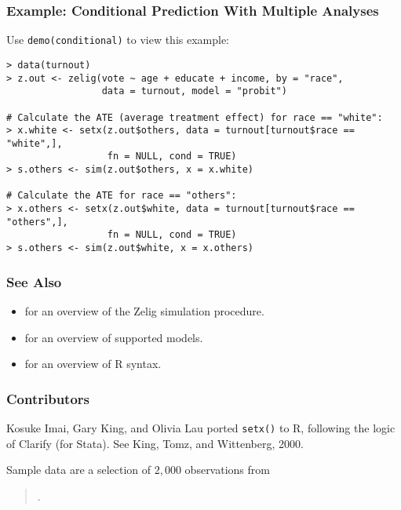 \subsubsection{Example: Conditional Prediction With Multiple Analyses}
Use {\tt demo(conditional)} to view this example:  
\begin{verbatim}
> data(turnout)
> z.out <- zelig(vote ~ age + educate + income, by = "race",
                 data = turnout, model = "probit")

# Calculate the ATE (average treatment effect) for race == "white":
> x.white <- setx(z.out$others, data = turnout[turnout$race == "white",], 
                  fn = NULL, cond = TRUE)
> s.others <- sim(z.out$others, x = x.white)

# Calculate the ATE for race == "others":
> x.others <- setx(z.out$white, data = turnout[turnout$race == "others",], 
                  fn = NULL, cond = TRUE)
> s.others <- sim(z.out$white, x = x.others)
\end{verbatim} %

\subsubsection{See Also}
  \begin{itemize}
  \item {} for an overview of the Zelig simulation
    procedure.
  \item {} for an overview of supported models.
  \item {} for an overview of R syntax.
\end{itemize}

\subsubsection{Contributors}

Kosuke Imai, Gary King, and Olivia Lau ported {\tt setx()} to R, following
the logic of Clarify (for Stata).  See King, Tomz, and Wittenberg,
2000.\nocite{KinTomWit00}

Sample data are a selection of $2,000$ observations from

\begin{verse}
.
\end{verse}


